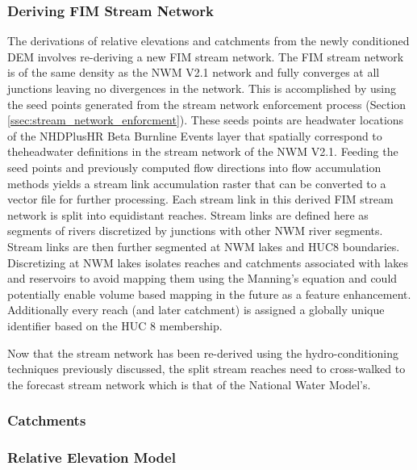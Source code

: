 \subsubsection{Deriving FIM Stream Network}
%
The derivations of relative elevations and catchments from the newly conditioned DEM involves re-deriving a new FIM stream network. 
The FIM stream network is of the same density as the NWM V2.1 network and fully converges at all junctions leaving no divergences in the network.
This is accomplished by using the seed points generated from the stream network enforcement process (Section \ref{ssec:stream_network_enforcment}).
These seeds points are headwater locations of the NHDPlusHR Beta Burnline Events layer that spatially correspond to theheadwater definitions in the stream network of the NWM V2.1.
Feeding the seed points and previously computed flow directions into flow accumulation methods \cite{wallis2009parallel,tarboton1997new,tarboton2005terrain} yields a stream link accumulation raster that can be converted to a vector file for further processing.
Each stream link in this derived FIM stream network is split into equidistant reaches.
Stream links are defined here as segments of rivers discretized by junctions with other NWM river segments.
Stream links are then further segmented at NWM lakes and HUC8 boundaries.
Discretizing at NWM lakes isolates reaches and catchments associated with lakes and reservoirs to avoid mapping them using the Manning's equation and could potentially enable volume based mapping in the future as a feature enhancement.
Additionally every reach (and later catchment) is assigned a globally unique identifier based on the HUC 8 membership.

Now that the stream network has been re-derived using the hydro-conditioning techniques previously discussed, the split stream reaches need to cross-walked to the forecast stream network which is that of the National Water Model's.
%
\subsubsection{Catchments}
%

%
\subsubsection{Relative Elevation Model}
%

